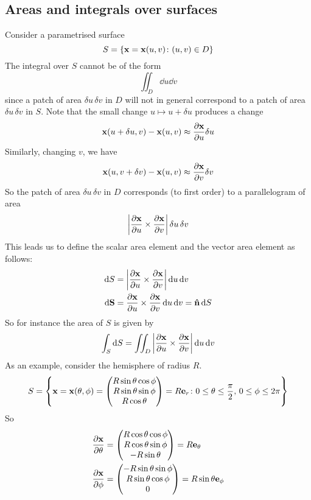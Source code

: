 \subsection{Areas and integrals over surfaces}
Consider a parametrised surface
\[
	S = \{ \vb x = \vb x(u, v) \colon (u, v) \in D \}
\]
The integral over \(S\) cannot be of the form
\[
	\iint_D \dd{u}\dd{v}
\]
since a patch of area \(\delta u \,\delta v\) in \(D\) will not in general correspond to a patch of area \(\delta u \,\delta v\) in \(S\).
Note that the small change \(u \mapsto u + \delta u\) produces a change
\[
	\vb x(u + \delta u, v) - \vb x(u, v) \approx \frac{\partial \vb x}{\partial u} \delta u
\]
Similarly, changing \(v\), we have
\[
	\vb x(u, v + \delta v) - \vb x(u, v) \approx \frac{\partial \vb x}{\partial v} \delta v
\]
So the patch of area \(\delta u\,\delta v\) in \(D\) corresponds (to first order) to a parallelogram of area
\[
	\abs{\frac{\partial \vb x}{\partial u} \times \frac{\partial \vb x}{\partial v}} \,\delta u\,\delta v
\]
This leads us to define the scalar area element and the vector area element as follows:
\begin{align*}
	\dd{S}    & = \abs{\frac{\partial \vb x}{\partial u} \times \frac{\partial \vb x}{\partial v}}\dd{u}\dd{v}          \\
	\dd \vb S & = \frac{\partial \vb x}{\partial u} \times \frac{\partial \vb x}{\partial v}\dd{u}\dd{v} = \vu{n} \dd{S}
\end{align*}
So for instance the area of \(S\) is given by
\[
	\int_S \dd{S} = \iint_D \abs{\frac{\partial \vb x}{\partial u} \times \frac{\partial \vb x}{\partial v}}\dd{u}\dd{v}
\]
As an example, consider the hemisphere of radius \(R\).
\[
	S = \left\{ \vb x = \vb x(\theta, \phi) = \begin{pmatrix}
		R\sin\theta \cos\phi \\ R\sin\theta \sin\phi \\ R\cos\theta
	\end{pmatrix} = R \vb e_r \colon 0 \leq \theta \leq \frac{\pi}{2},\, 0 \leq \phi \leq 2\pi \right\}
\]
So
\begin{align*}
	\frac{\partial \vb x}{\partial \theta} & = \begin{pmatrix}
		R\cos\theta \cos\phi \\ R\cos\theta \sin\phi \\ -R\sin\theta
	\end{pmatrix} = R\vb e_\theta         \\
	\frac{\partial \vb x}{\partial \phi}   & = \begin{pmatrix}
		-R\sin\theta \sin\phi \\ R\sin\theta \cos\phi \\ 0
	\end{pmatrix} = R\sin\theta\vb e_\phi \\
\end{align*}

